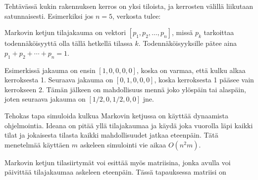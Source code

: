 Tehtävässä kukin rakennuksen kerros
on yksi tiloista, ja kerrosten välillä liikutaan
satunnaisesti.
Esimerkiksi jos $n=5$, verkosta tulee:

\begin{center}
\end{center}

Markovin ketjun tilajakauma on vektori
$[p_1,p_2,\ldots,p_n]$, missä $p_k$ tarkoittaa
todennäköisyyttä olla tällä hetkellä tilassa $k$.
Todennäköisyyksille pätee aina $p_1+p_2+\cdots+p_n=1$.

Esimerkissä jakauma on ensin $[1,0,0,0,0]$,
koska on varmaa, että kulku alkaa kerroksesta 1.
Seuraava jakauma on $[0,1,0,0,0]$,
koska kerroksesta 1 pääsee vain kerrokseen 2.
Tämän jälkeen on mahdollisuus mennä joko ylöspäin
tai alaspäin, joten seuraava jakauma on $[1/2,0,1/2,0,0]$ jne.

Tehokas tapa simuloida kulkua Markovin ketjussa
on käyttää dynaamista ohjelmointia.
Ideana on pitää yllä tilajakaumaa
ja käydä joka vuorolla läpi kaikki tilat
ja jokaisesta tilasta kaikki mahdollisuudet jatkaa eteenpäin.
Tätä menetelmää käyttäen $m$ askeleen simulointi
vie aikaa $O(n^2 m)$.

Markovin ketjun tilasiirtymät voi esittää myös matriisina,
jonka avulla voi päivittää tilajakaumaa askeleen eteenpäin.
Tässä tapauksessa matriisi on

